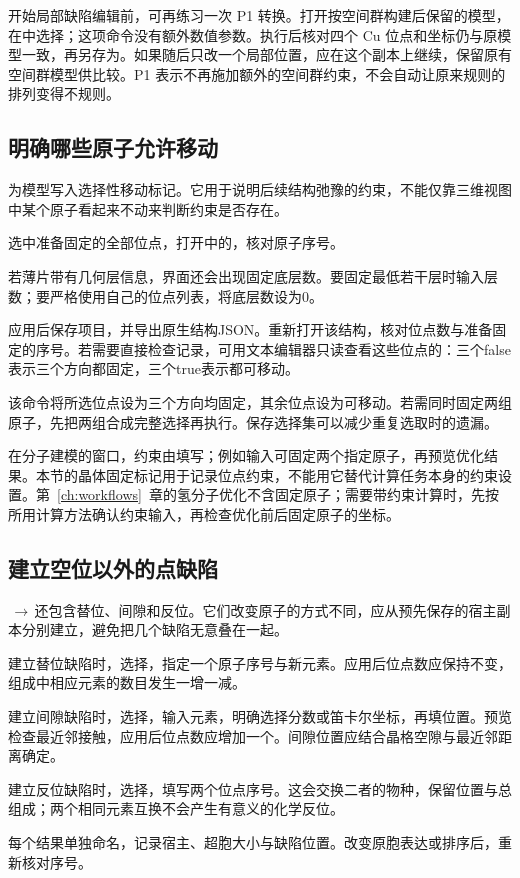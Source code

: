 开始局部缺陷编辑前，可再练习一次 P1 转换。打开按空间群构建后保留的模型，在中选择；这项命令没有额外数值参数。执行后核对四个 Cu 位点和坐标仍与原模型一致，再另存为。如果随后只改一个局部位置，应在这个副本上继续，保留原有空间群模型供比较。P1 表示不再施加额外的空间群约束，不会自动让原来规则的排列变得不规则。

\subsection{明确哪些原子允许移动}\label{sec:fixed-sites-reference}

为模型写入选择性移动标记。它用于说明后续结构弛豫的约束，不能仅靠三维视图中某个原子看起来不动来判断约束是否存在。

\begin{steps}
  \item 选中准备固定的全部位点，打开中的，核对原子序号。
  \item 若薄片带有几何层信息，界面还会出现固定底层数。要固定最低若干层时输入层数；要严格使用自己的位点列表，将底层数设为0。
  \item 应用后保存项目，并导出原生结构JSON。重新打开该结构，核对位点数与准备固定的序号。若需要直接检查记录，可用文本编辑器只读查看这些位点的：三个false表示三个方向都固定，三个true表示都可移动。
\end{steps}

该命令将所选位点设为三个方向均固定，其余位点设为可移动。若需同时固定两组原子，先把两组合成完整选择再执行。保存选择集可以减少重复选取时的遗漏。

在分子建模的窗口，约束由填写；例如输入可固定两个指定原子，再预览优化结果。本节的晶体固定标记用于记录位点约束，不能用它替代计算任务本身的约束设置。第~\ref{ch:workflows}~章的氢分子优化不含固定原子；需要带约束计算时，先按所用计算方法确认约束输入，再检查优化前后固定原子的坐标。

\subsection{建立空位以外的点缺陷}\label{sec:other-defects-reference}

\,$\rightarrow$\,还包含替位、间隙和反位。它们改变原子的方式不同，应从预先保存的宿主副本分别建立，避免把几个缺陷无意叠在一起。

\begin{steps}
  \item 建立替位缺陷时，选择，指定一个原子序号与新元素。应用后位点数应保持不变，组成中相应元素的数目发生一增一减。
  \item 建立间隙缺陷时，选择，输入元素，明确选择分数或笛卡尔坐标，再填位置。预览检查最近邻接触，应用后位点数应增加一个。间隙位置应结合晶格空隙与最近邻距离确定。
  \item 建立反位缺陷时，选择，填写两个位点序号。这会交换二者的物种，保留位置与总组成；两个相同元素互换不会产生有意义的化学反位。
  \item 每个结果单独命名，记录宿主、超胞大小与缺陷位置。改变原胞表达或排序后，重新核对序号。
\end{steps}

